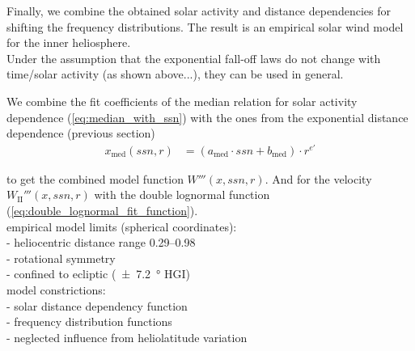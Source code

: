 Finally, we combine the obtained solar activity and distance dependencies for shifting the frequency distributions. The result is an empirical solar wind model for the inner heliosphere.\\

Under the assumption that the exponential fall-off laws do not change with time/solar activity (as shown above...), they can be used in general.

We combine the fit coefficients of the median relation for solar activity dependence (\ref{eq:median_with_ssn}) with the ones from the exponential distance dependence (previous section)
\begin{align}
	x_\text{med}(ssn,r) &= (a_\text{med} \cdot ssn + b_\text{med}) \cdot r^{e'}
\end{align}

to get the combined model function $W'''(x,ssn,r)$. And for the velocity $W_\text{II}'''(x,ssn,r)$ with the double lognormal function (\ref{eq:double_lognormal_fit_function}).\\



empirical model limits (spherical coordinates):\\
- heliocentric distance range \SIrange{0.29}{0.98}{\au}\\
- rotational symmetry\\
- confined to ecliptic (\SI{+-7.2}{\degree} HGI)\\
model constrictions:\\
- solar distance dependency function\\
- frequency distribution functions\\
- neglected influence from heliolatitude variation\\


